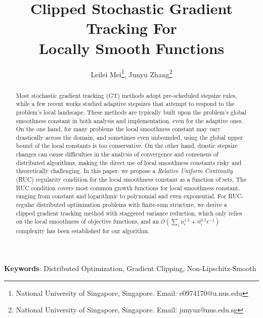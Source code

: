 \documentclass{article}
\title{Clipped Stochastic Gradient Tracking For\\  Locally Smooth Functions}
\author{Leilei Mei\thanks{National University of Singapore, Singapore. Email: e0974170@u.nus.edu},   
Junyu Zhang\thanks{National University of Singapore, Singapore. Email: junyuz@nus.edu.sg}}
\date{}
\newcommand{\cO}{\mathcal{O}}
\newcommand\keywords[1]{\textbf{Keywords}: #1}
\begin{document}
\maketitle

\begin{abstract}
Most stochastic gradient tracking (GT) methods adopt pre-scheduled stepsize rules, while a few recent works studied adaptive stepsizes that attempt to respond to the problem's local landscape. These methods are typically built upon the problem's global smoothness constant in both analysis and implementation, even for the adaptive ones. On the one hand, for many problems the local smoothness constant may vary drastically across the domain, and sometimes even unbounded, using the global upper bound of the local constants is too conservative. On the other hand, drastic stepsize changes can cause difficulties in the analysis of convergence and consensus of distributed algorithms, making the direct use of local smoothness constants risky and theoretically challenging. In this paper, we propose a \emph{Relative Uniform Continuity} (RUC) regularity condition for the local smoothness constant as a function of sets. The RUC condition covers most common growth functions for local smoothness constant, ranging from constant and logarithmic to polynomial and even exponential. For RUC-regular distributed optimization problems with finite-sum structure, we derive a clipped gradient tracking method with staggered variance reduction, which only relies on the local smoothness of objective functions, and an  $\cO(\sum_in_i^{1.5}+n_i^{0.5}\epsilon^{-1})$ complexity has been established for our algorithm. 
\end{abstract}



\keywords{Distributed Optimization, Gradient Clipping, Non-Lipschitz-Smooth}
\end{document}
